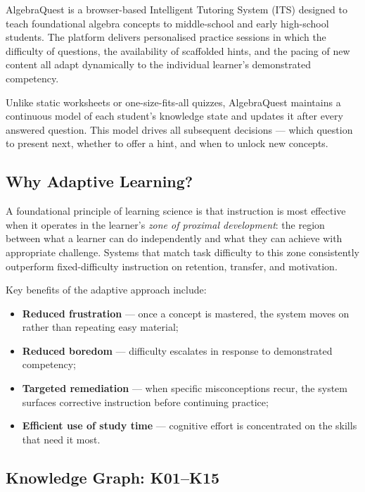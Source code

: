 \documentclass[12pt,a4paper]{article}
\begin{document}
AlgebraQuest is a browser-based Intelligent Tutoring System (ITS) designed to
teach foundational algebra concepts to middle-school and early high-school
students. The platform delivers personalised practice sessions in which the
difficulty of questions, the availability of scaffolded hints, and the pacing
of new content all adapt dynamically to the individual learner's demonstrated
competency.

Unlike static worksheets or one-size-fits-all quizzes, AlgebraQuest maintains
a continuous model of each student's knowledge state and updates it after every
answered question. This model drives all subsequent decisions — which question
to present next, whether to offer a hint, and when to unlock new concepts.

\subsection{Why Adaptive Learning?}

A foundational principle of learning science is that instruction is most
effective when it operates in the learner's \emph{zone of proximal
development}: the region between what a learner can do
independently and what they can achieve with appropriate challenge. Systems
that match task difficulty to this zone consistently outperform fixed-difficulty
instruction on retention, transfer, and motivation.

Key benefits of the adaptive approach include:

\begin{itemize}[leftmargin=1.8em]
  \item \textbf{Reduced frustration} — once a concept is mastered, the system
        moves on rather than repeating easy material;
  \item \textbf{Reduced boredom} — difficulty escalates in response to
        demonstrated competency;
  \item \textbf{Targeted remediation} — when specific misconceptions recur, the
        system surfaces corrective instruction before continuing practice;
  \item \textbf{Efficient use of study time} — cognitive effort is concentrated
        on the skills that need it most.
\end{itemize}

\subsection{Knowledge Graph: K01–K15}
\end{document}
